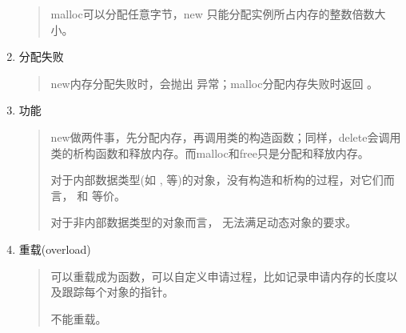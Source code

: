 \documentclass[letterpaper,10pt,english]{sphinxmanual}
\begin{document}
\begin{enumerate}
\begin{quote}
malloc可以分配任意字节，new 只能分配实例所占内存的整数倍数大小。
\end{quote}

\item {} 
分配失败
\begin{quote}

new内存分配失败时，会抛出  异常；malloc分配内存失败时返回  。
\end{quote}

\item {} 
功能
\begin{quote}

new做两件事，先分配内存，再调用类的构造函数；同样，delete会调用类的析构函数和释放内存。而malloc和free只是分配和释放内存。

对于内部数据类型(如  ,  等)的对象，没有构造和析构的过程，对它们而言，  和  等价。

对于非内部数据类型的对象而言，  无法满足动态对象的要求。
\end{quote}

\item {} 
重载(overload)
\begin{quote}

 可以重载成为函数，可以自定义申请过程，比如记录申请内存的长度以及跟踪每个对象的指针。

 不能重载。
\end{quote}

\end{enumerate}
\end{document}
